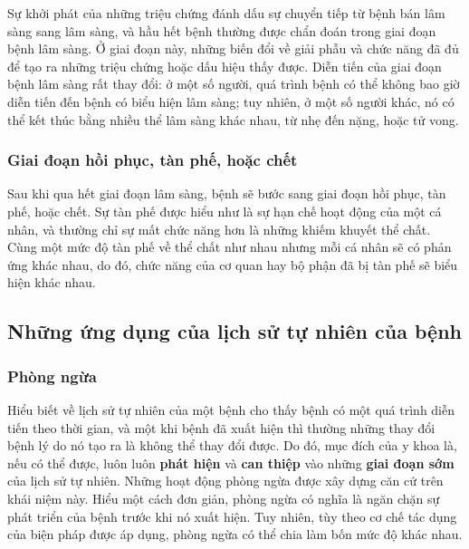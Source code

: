 \documentclass[
]{book}
\begin{document}
Sự khởi phát của những triệu chứng đánh dấu sự chuyển tiếp từ bệnh bán lâm sàng sang lâm sàng, và hầu hết bệnh thường được chẩn đoán trong giai đoạn bệnh lâm sàng. Ở giai đoạn này, những biến đổi về giải phẫu và chức năng đã đủ để tạo ra những triệu chứng hoặc dấu hiệu thấy được. Diễn tiến của giai đoạn bệnh lâm sàng rất thay đổi: ở một số người, quá trình bệnh có thể không bao giờ diễn tiến đến bệnh có biểu hiện lâm sàng; tuy nhiên, ở một số người khác, nó có thể kết thúc bằng nhiều thể lâm sàng khác nhau, từ nhẹ đến nặng, hoặc tử vong.

\hypertarget{giai-ux111oux1ea1n-hux1ed3i-phux1ee5c-tuxe0n-phux1ebf-houx1eb7c-chux1ebft}{%
\subsubsection{Giai đoạn hồi phục, tàn phế, hoặc chết}\label{giai-ux111oux1ea1n-hux1ed3i-phux1ee5c-tuxe0n-phux1ebf-houx1eb7c-chux1ebft}}

Sau khi qua hết giai đoạn lâm sàng, bệnh sẽ bước sang giai đoạn hồi phục, tàn phế, hoặc chết. Sự tàn phế được hiểu như là sự hạn chế hoạt động của một cá nhân, và thường chỉ sự mất chức năng hơn là những khiếm khuyết thể chất. Cùng một mức độ tàn phế về thể chất như nhau nhưng mỗi cá nhân sẽ có phản ứng khác nhau, do đó, chức năng của cơ quan hay bộ phận đã bị tàn phế sẽ biểu hiện khác nhau.

\hypertarget{nhux1eefng-ux1ee9ng-dux1ee5ng-cux1ee7a-lux1ecbch-sux1eed-tux1ef1-nhiuxean-cux1ee7a-bux1ec7nh}{%
\subsection{Những ứng dụng của lịch sử tự nhiên của bệnh}\label{nhux1eefng-ux1ee9ng-dux1ee5ng-cux1ee7a-lux1ecbch-sux1eed-tux1ef1-nhiuxean-cux1ee7a-bux1ec7nh}}

\hypertarget{phuxf2ng-ngux1eeba}{%
\subsubsection{Phòng ngừa}\label{phuxf2ng-ngux1eeba}}

Hiểu biết về lịch sử tự nhiên của một bệnh cho thấy bệnh có một quá trình diễn tiến theo thời gian, và một khi bệnh đã xuất hiện thì thường những thay đổi bệnh lý do nó tạo ra là không thể thay đổi được. Do đó, mục đích của y khoa là, nếu có thể được, luôn luôn \textbf{phát hiện} và \textbf{can thiệp} vào những \textbf{giai đoạn sớm} của lịch sử tự nhiên. Những hoạt động phòng ngừa được xây dựng căn cứ trên khái niệm này. Hiểu một cách đơn giản, phòng ngừa có nghĩa là ngăn chặn sự phát triển của bệnh trước khi nó xuất hiện. Tuy nhiên, tùy theo cơ chế tác dụng của biện pháp được áp dụng, phòng ngừa có thể chia làm bốn mức độ khác nhau.
\end{document}
